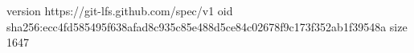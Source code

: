 version https://git-lfs.github.com/spec/v1
oid sha256:ecc4fd585495f638afad8c935c85e488d5ce84c02678f9c173f352ab1f39548a
size 1647
